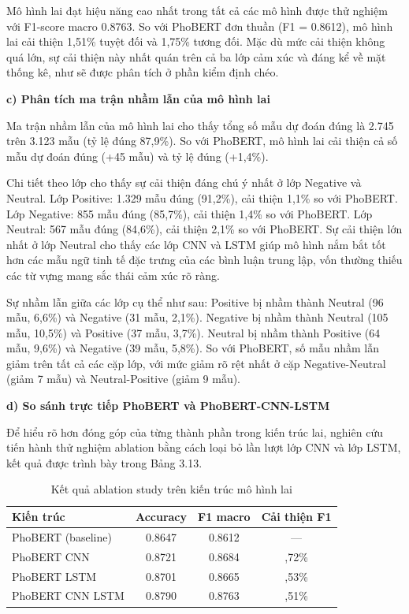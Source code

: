\documentclass[14pt, a4paper]{report}
\begin{document}
Mô hình lai đạt hiệu năng cao nhất trong tất cả các mô hình được thử nghiệm với F1-score macro 0.8763. So với PhoBERT đơn thuần (F1 = 0.8612), mô hình lai cải thiện 1,51\% tuyệt đối và 1,75\% tương đối. Mặc dù mức cải thiện không quá lớn, sự cải thiện này nhất quán trên cả ba lớp cảm xúc và đáng kể về mặt thống kê, như sẽ được phân tích ở phần kiểm định chéo.


\textbf{c) Phân tích ma trận nhầm lẫn của mô hình lai}


Ma trận nhầm lẫn của mô hình lai cho thấy tổng số mẫu dự đoán đúng là 2.745 trên 3.123 mẫu (tỷ lệ đúng 87,9\%). So với PhoBERT, mô hình lai cải thiện cả số mẫu dự đoán đúng (+45 mẫu) và tỷ lệ đúng (+1,4\%).


Chi tiết theo lớp cho thấy sự cải thiện đáng chú ý nhất ở lớp Negative và Neutral. Lớp Positive: 1.329 mẫu đúng (91,2\%), cải thiện 1,1\% so với PhoBERT. Lớp Negative: 855 mẫu đúng (85,7\%), cải thiện 1,4\% so với PhoBERT. Lớp Neutral: 567 mẫu đúng (84,6\%), cải thiện 2,1\% so với PhoBERT. Sự cải thiện lớn nhất ở lớp Neutral cho thấy các lớp CNN và LSTM giúp mô hình nắm bắt tốt hơn các mẫu ngữ tinh tế đặc trưng của các bình luận trung lập, vốn thường thiếu các từ vựng mang sắc thái cảm xúc rõ ràng.


Sự nhầm lẫn giữa các lớp cụ thể như sau: Positive bị nhầm thành Neutral (96 mẫu, 6,6\%) và Negative (31 mẫu, 2,1\%). Negative bị nhầm thành Neutral (105 mẫu, 10,5\%) và Positive (37 mẫu, 3,7\%). Neutral bị nhầm thành Positive (64 mẫu, 9,6\%) và Negative (39 mẫu, 5,8\%). So với PhoBERT, số mẫu nhầm lẫn giảm trên tất cả các cặp lớp, với mức giảm rõ rệt nhất ở cặp Negative-Neutral (giảm 7 mẫu) và Neutral-Positive (giảm 9 mẫu).


\textbf{d) So sánh trực tiếp PhoBERT và PhoBERT-CNN-LSTM}


Để hiểu rõ hơn đóng góp của từng thành phần trong kiến trúc lai, nghiên cứu tiến hành thử nghiệm ablation bằng cách loại bỏ lần lượt lớp CNN và lớp LSTM, kết quả được trình bày trong Bảng 3.13.


\begin{table}[h]
\centering
\caption{Kết quả ablation study trên kiến trúc mô hình lai}
\begin{tabular}{|l|c|c|c|}
\hline
\textbf{Kiến trúc} & \textbf{Accuracy} & \textbf{F1 macro} & \textbf{Cải thiện F1} \\
\hline
PhoBERT (baseline) & 0.8647 & 0.8612 & — \\
\hline
PhoBERT \+ CNN & 0.8721 & 0.8684 & \+0,72\% \\
\hline
PhoBERT \+ LSTM & 0.8701 & 0.8665 & \+0,53\% \\
\hline
PhoBERT \+ CNN \+ LSTM & 0.8790 & 0.8763 & \+1,51\% \\
\hline
\end{tabular}
\end{table}
\end{document}
